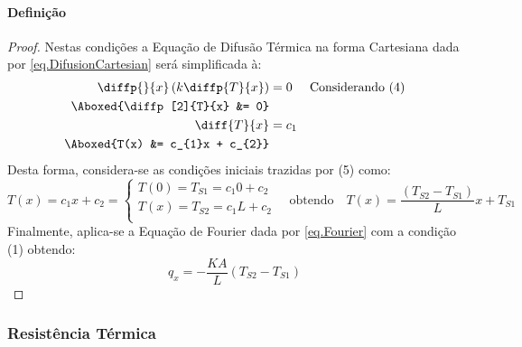 \documentclass{article}
\begin{document}
            \paragraph{Definição}
                \begin{proof}
                    Nestas condições a Equação de Difusão Térmica na forma Cartesiana dada por \ref{eq.DifusionCartesian} será simplificada à:
                        \begin{align*}
                            \diffp{}{x}\left(k\diffp{T}{x}\right) &= 0 & \text{Considerando (4)}\\
                            \Aboxed{\diffp[2]{T}{x} &= 0}\\
                            \diff{T}{x} &= c_{1}\\
                            \Aboxed{T(x) &= c_{1}x + c_{2}}\\
                        \end{align*}
                    Desta forma, considera-se as condições iniciais trazidas por (5) como:
                        \begin{equation*}
                            T(x) = c_{1}x + c_{2} = 
                            \begin{cases}
                                T(0) = T_{S1} = c_{1}0 + c_{2}\\
                                T(x) = T_{S2} = c_{1}L + c_{2}\\
                            \end{cases}
                            \quad
                            \text{obtendo}
                            \quad
                            \boxed{
                                T(x) = \frac{(T_{S2} - T_{S1})}{L}x + T_{S1}
                            }
                        \end{equation*}
                    Finalmente, aplica-se a Equação de Fourier dada por \ref{eq.Fourier} com a condição (1) obtendo:
                        \begin{equation*}
                            \boxed{q_{x} = -\frac{K A}{L}(T_{S2} - T_{S1})}
                        \end{equation*}
                \end{proof}

        \subsubsection{Resistência Térmica}
\end{document}
